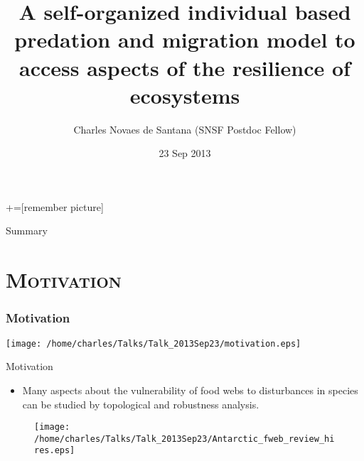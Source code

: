 \documentclass[xcolor=x11names,compress]{beamer}
\renewcommand{\(}{\begin{columns}}
\renewcommand{\)}{\end{columns}}
\newcommand{\<}[1]{\begin{column}{#1}}
\renewcommand{\>}{\end{column}}
\begin{document}
\def\newblock{\hskip .11em plus .33em minus .07em}
+=[remember picture]

\everymath{\displaystyle}

\title[Self Organized Food Web Model]{A self-organized individual based predation and migration model to access aspects of the resilience of ecosystems}
\author[C. N. de Santana]{Charles Novaes de Santana (\small{SNSF Postdoc Fellow})}
\date{23 Sep 2013}
\titlepage

\begin{frame}{Summary}
\tableofcontents
\end{frame}

\section{\scshape Motivation}

\begin{frame}
\frametitle{Motivation}
\centering \texttt{[image: /home/charles/Talks/Talk\_2013Sep23/motivation.eps]}
\end{frame}

\begin{frame}{Motivation}
\begin{itemize}
\item Many aspects about the vulnerability of food webs to disturbances in species can be studied by topological and robustness analysis.
\end{itemize}
\begin{figure}
\texttt{[image: /home/charles/Talks/Talk\_2013Sep23/Antarctic\_fweb\_review\_hires.eps]}
\end{figure}
\end{frame}
\end{document}
